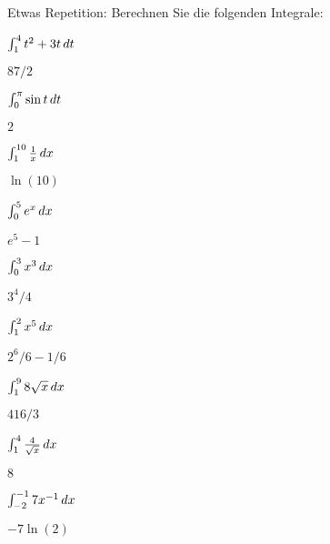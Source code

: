 \begin{exercises}
\noindent Etwas Repetition: \newline Berechnen Sie die folgenden Integrale:

\twocol

\begin{exercise} $\int_1^4 t^2+3t\, d t$
\begin{answer} $87/2$
\end{answer}\end{exercise}

\begin{exercise} $\int_0^\pi \sin t\, d t$
\begin{answer} $2$
\end{answer}\end{exercise}

\begin{exercise} $\int_1^{10} {1\over x}\, d x$
\begin{answer} $\ln(10)$
\end{answer}\end{exercise}

\begin{exercise} $\int_0^5 e^x\, d x$
\begin{answer} $e^5-1$
\end{answer}\end{exercise}

\begin{exercise} $\int_0^3 x^3\, d x$
\begin{answer} $3^4/4$
\end{answer}\end{exercise}

\begin{exercise} $\int_1^2 x^5\, d x$
\begin{answer} $2^6/6 -1/6$
\end{answer}\end{exercise}


\begin{exercise} $\int_1^9 8\sqrt{x}\, d x$
\begin{answer} $416/3$
\end{answer}\end{exercise}

\begin{exercise} $\int_1^4 \frac{4}{\sqrt{x}}\, d x$
\begin{answer} $8$
\end{answer}\end{exercise}


\begin{exercise} $\int_{-2}^{-1}7x^{-1}\, d x$
\begin{answer} $-7\ln(2)$
\end{answer}\end{exercise}



\end{exercises}
